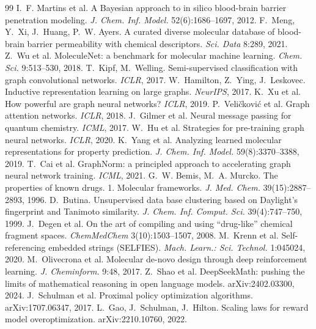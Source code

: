 \documentclass[10pt,letterpaper]{article}
\begin{document}
\clearpage
\begin{thebibliography}{99}
 I.~F. Martins et al. A Bayesian approach to in silico blood-brain barrier penetration modeling. \emph{J. Chem. Inf. Model.} 52(6):1686--1697, 2012.
 F.~Meng, Y.~Xi, J.~Huang, P.~W. Ayers. A curated diverse molecular database of blood-brain barrier permeability with chemical descriptors. \emph{Sci. Data} 8:289, 2021.
 Z.~Wu et al. MoleculeNet: a benchmark for molecular machine learning. \emph{Chem. Sci.} 9:513--530, 2018.
 T.~Kipf, M.~Welling. Semi-supervised classification with graph convolutional networks. \emph{ICLR}, 2017.
 W.~Hamilton, Z.~Ying, J.~Leskovec. Inductive representation learning on large graphs. \emph{NeurIPS}, 2017.
 K.~Xu et al. How powerful are graph neural networks? \emph{ICLR}, 2019.
 P.~Veli\v{c}kovi\'c et al. Graph attention networks. \emph{ICLR}, 2018.
 J.~Gilmer et al. Neural message passing for quantum chemistry. \emph{ICML}, 2017.
 W.~Hu et al. Strategies for pre-training graph neural networks. \emph{ICLR}, 2020.
 K.~Yang et al. Analyzing learned molecular representations for property prediction. \emph{J. Chem. Inf. Model.} 59(8):3370--3388, 2019.
 T.~Cai et al. GraphNorm: a principled approach to accelerating graph neural network training. \emph{ICML}, 2021.
 G.~W. Bemis, M.~A. Murcko. The properties of known drugs. 1. Molecular frameworks. \emph{J. Med. Chem.} 39(15):2887--2893, 1996.
 D.~Butina. Unsupervised data base clustering based on Daylight's fingerprint and Tanimoto similarity. \emph{J. Chem. Inf. Comput. Sci.} 39(4):747--750, 1999.
 J.~Degen et al. On the art of compiling and using ``drug-like'' chemical fragment spaces. \emph{ChemMedChem} 3(10):1503--1507, 2008.
 M.~Krenn et al. Self-referencing embedded strings (SELFIES). \emph{Mach. Learn.: Sci. Technol.} 1:045024, 2020.
 M.~Olivecrona et al. Molecular de-novo design through deep reinforcement learning. \emph{J. Cheminform.} 9:48, 2017.
 Z.~Shao et al. DeepSeekMath: pushing the limits of mathematical reasoning in open language models. arXiv:2402.03300, 2024.
 J.~Schulman et al. Proximal policy optimization algorithms. arXiv:1707.06347, 2017.
 L.~Gao, J.~Schulman, J.~Hilton. Scaling laws for reward model overoptimization. arXiv:2210.10760, 2022.

\end{thebibliography}
\end{document}
